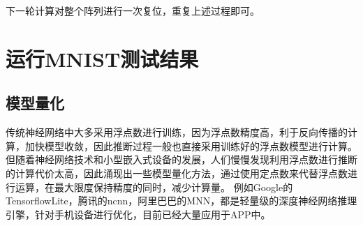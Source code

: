 下一轮计算对整个阵列进行一次复位，重复上述过程即可。


\section{运行MNIST测试结果}
    \subsection{模型量化}
    传统神经网络中大多采用浮点数进行训练，因为浮点数精度高，利于反向传播的计算，加快模型收敛，因此推断过程一般也直接采用训练好的浮点数模型进行计算。
    但随着神经网络技术和小型嵌入式设备的发展，人们慢慢发现利用浮点数进行推断的计算代价太高，因此涌现出一些模型量化方法，通过使用定点数来代替浮点数进行运算，在最大限度保持精度的同时，减少计算量。
    例如Google的TensorflowLite，腾讯的ncnn，阿里巴巴的MNN，都是轻量级的深度神经网络推理引擎，针对手机设备进行优化，目前已经大量应用于APP中。

